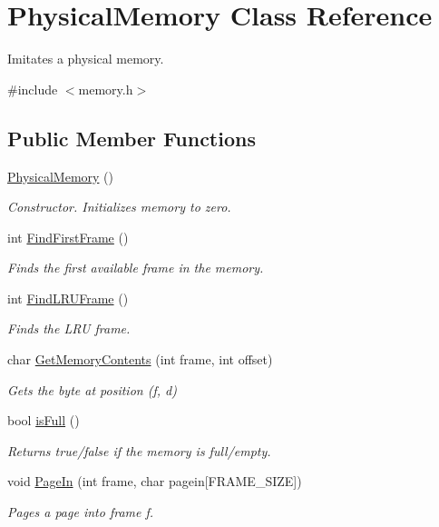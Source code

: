 \hypertarget{classPhysicalMemory}{}\section{Physical\+Memory Class Reference}
\label{classPhysicalMemory}


Imitates a physical memory.  




{\ttfamily \#include $<$memory.\+h$>$}

\subsection*{Public Member Functions}
\begin{DoxyCompactItemize}
\item 
\hyperlink{classPhysicalMemory_ad7fefaba61061c7339164836c6c02eaa}{Physical\+Memory} ()\hypertarget{classPhysicalMemory_ad7fefaba61061c7339164836c6c02eaa}{}\label{classPhysicalMemory_ad7fefaba61061c7339164836c6c02eaa}

\begin{DoxyCompactList}\small\item\em Constructor. Initializes memory to zero. \end{DoxyCompactList}\item 
int \hyperlink{classPhysicalMemory_a41ba2824ae9550b68036536d94ae8b32}{Find\+First\+Frame} ()
\begin{DoxyCompactList}\small\item\em Finds the first available frame in the memory. \end{DoxyCompactList}\item 
int \hyperlink{classPhysicalMemory_a42df1a804726f716ce4d3c2a87cda949}{Find\+L\+R\+U\+Frame} ()
\begin{DoxyCompactList}\small\item\em Finds the L\+RU frame. \end{DoxyCompactList}\item 
char \hyperlink{classPhysicalMemory_a2d6b5c45f2377838a76e58b2c083610a}{Get\+Memory\+Contents} (int frame, int offset)
\begin{DoxyCompactList}\small\item\em Gets the byte at position (f, d) \end{DoxyCompactList}\item 
bool \hyperlink{classPhysicalMemory_acde26e332e20349baa6c409b88635258}{is\+Full} ()
\begin{DoxyCompactList}\small\item\em Returns true/false if the memory is full/empty. \end{DoxyCompactList}\item 
void \hyperlink{classPhysicalMemory_a70cb4ae5b23f04cb347ac93cc9fc1028}{Page\+In} (int frame, char pagein\mbox{[}F\+R\+A\+M\+E\+\_\+\+S\+I\+ZE\mbox{]})
\begin{DoxyCompactList}\small\item\em Pages a page into frame f. \end{DoxyCompactList}\end{DoxyCompactItemize}


